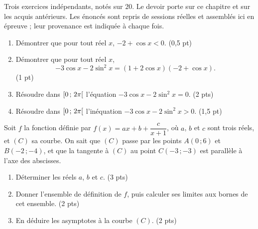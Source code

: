 \begin{devoir}[2 heures]
Trois exercices indépendants, notés sur $20$. Le devoir porte sur ce chapitre
et sur les acquis antérieurs. Les énoncés sont repris de sessions réelles et
assemblés ici en épreuve ; leur provenance est indiquée à chaque fois.

\begin{enumerate}[label=\textbf{\arabic*.}, leftmargin=*, itemsep=0.2em]
  \item Démontrer que pour tout réel $x$, $-2+\cos x < 0$.
        \hfill\textup{(0,5 pt)}
  \item Démontrer que pour tout réel $x$,
        \[
          -3\cos x-2\sin^{2}x = \left(1+2\cos x\right)\left(-2+\cos x\right).
        \]
        \hfill\textup{(1 pt)}
  \item Résoudre dans $\left[0\,;\,2\pi\right[$ l'équation
        $-3\cos x-2\sin^{2}x = 0$. \hfill\textup{(2 pts)}
  \item Résoudre dans $\left[0\,;\,2\pi\right[$ l'inéquation
        $-3\cos x-2\sin^{2}x > 0$. \hfill\textup{(1,5 pt)}
\end{enumerate}

Soit $f$ la fonction définie par $f(x) = ax+b+\dfrac{c}{x+1}$, où $a$, $b$ et
$c$ sont trois réels, et $(C)$ sa courbe. On sait que $(C)$ passe par les
points $A(0\,;6)$ et $B(-2\,;-4)$, et que la tangente à $(C)$ au point
$C(-3\,;-3)$ est parallèle à l'axe des abscisses.
\begin{enumerate}[label=\textbf{\arabic*.}, leftmargin=*, itemsep=0.2em]
  \item Déterminer les réels $a$, $b$ et $c$. \hfill\textup{(3 pts)}
  \item Donner l'ensemble de définition de $f$, puis calculer ses limites aux
        bornes de cet ensemble. \hfill\textup{(2 pts)}
  \item En déduire les asymptotes à la courbe $(C)$. \hfill\textup{(2 pts)}
\end{enumerate}


\end{devoir}
